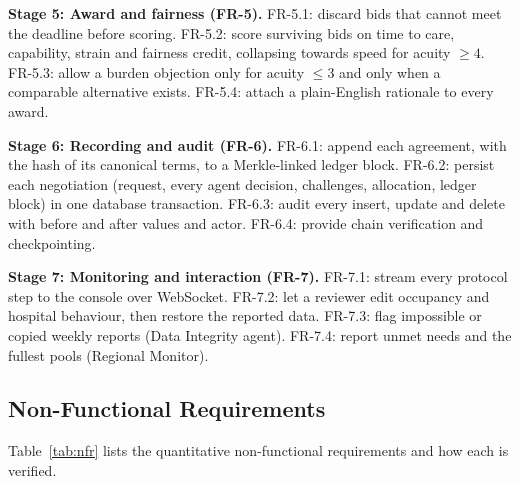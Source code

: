 \textbf{Stage 5: Award and fairness (FR-5).}
FR-5.1: discard bids that cannot meet the deadline before scoring.
FR-5.2: score surviving bids on time to care, capability, strain and fairness credit, collapsing towards speed for acuity $\ge4$.
FR-5.3: allow a burden objection only for acuity $\le3$ and only when a comparable alternative exists.
FR-5.4: attach a plain-English rationale to every award.

\textbf{Stage 6: Recording and audit (FR-6).}
FR-6.1: append each agreement, with the hash of its canonical terms, to a Merkle-linked ledger block.
FR-6.2: persist each negotiation (request, every agent decision, challenges, allocation, ledger block) in one database transaction.
FR-6.3: audit every insert, update and delete with before and after values and actor.
FR-6.4: provide chain verification and checkpointing.

\textbf{Stage 7: Monitoring and interaction (FR-7).}
FR-7.1: stream every protocol step to the console over WebSocket.
FR-7.2: let a reviewer edit occupancy and hospital behaviour, then restore the reported data.
FR-7.3: flag impossible or copied weekly reports (Data Integrity agent).
FR-7.4: report unmet needs and the fullest pools (Regional Monitor).

\subsection{Non-Functional Requirements}
Table~\ref{tab:nfr} lists the quantitative non-functional requirements and how each is verified.


